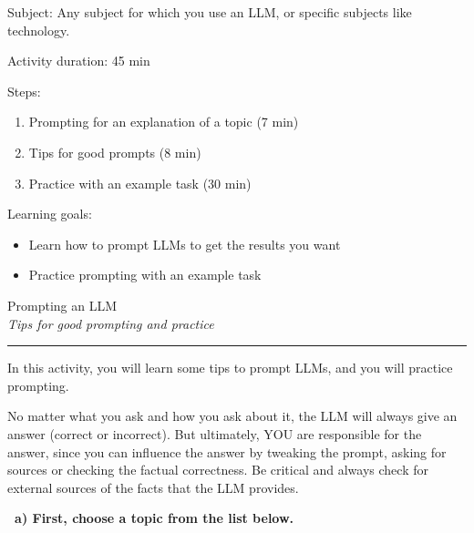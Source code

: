 \documentclass[12pt]{article}
\newcounter{exercise}
\newcommand{\exercisetitle}[2][]{%
  \refstepcounter{exercise}%
  \vspace{0.5cm}%
  \colorbox{maincolor}{%
    \makebox[\dimexpr\linewidth-2\fboxsep][l]{%
      \textcolor{white}{\faPen\ Assignment \theexercise:~ #2}%
    }%
  }%
  \if\relax\detokenize{#1}\relax\else\label{#1}\fi
  \vspace{0.3cm}%
}
\begin{document}
Subject: Any subject for which you use an LLM, or specific subjects like technology.

Activity duration: 45 min

\vspace{0.5cm}

Steps:
\begin{enumerate}
    \item Prompting for an explanation of a topic  (7 min)
    \item Tips for good prompts (8 min)
    \item Practice with an example task (30 min)
\end{enumerate}

Learning goals:

\begin{itemize}
    \item Learn how to prompt LLMs to get the results you want
    \item Practice prompting with an example task
\end{itemize}

\newpage

\begin{center}
    {\Huge \color{maincolor} Prompting an LLM}\\[5pt]
    {\large \textit{Tips for good prompting and practice}}\\
    \rule{\linewidth}{1pt}
\end{center}

\vspace{0.5cm}

In this activity, you will learn some tips to prompt LLMs, and you will practice prompting.

\begin{importantbox}
    No matter what you ask and how you ask about it, the LLM will always give an answer (correct or incorrect). But ultimately, YOU are responsible for the answer, since you can influence the answer by tweaking the prompt, asking for sources or checking the factual correctness. Be critical and always check for external sources of the facts that the LLM provides.
\end{importantbox}

\exercisetitle{Asking for an explanation of a topic}


\vspace{0.3cm}
\textcolor{maincolor}{\textbf{\faPen\ a) First, choose a topic from the list below.}}
\end{document}

